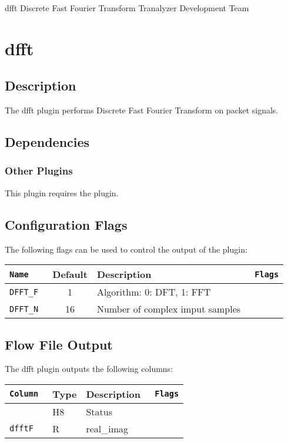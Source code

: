 \documentclass[documentation]{subfiles}
\begin{document}
\trantitle
    {dfft} %
    {Discrete Fast Fourier Transform} %
    {Tranalyzer Development Team} %

\section{dfft}\label{s:dfft}

\subsection{Description}
The dfft plugin performs Discrete Fast Fourier Transform on packet signals.

\subsection{Dependencies}

\subsubsection{Other Plugins}
This plugin requires the  plugin.

\subsection{Configuration Flags}
The following flags can be used to control the output of the plugin:
\begin{longtable}{>{\tt}lcl>{\tt\small}l}
    \toprule
    {\bf Name} & {\bf Default} & {\bf Description}               & {\bf Flags}\\
    \midrule\endhead%
    DFFT\_F     & 1            & Algorithm: 0: DFT, 1: FFT       & \\
    DFFT\_N     & 16           & Number of complex imput samples & \\
    \bottomrule
\end{longtable}

\subsection{Flow File Output}
The dfft plugin outputs the following columns:
\begin{longtable}{>{\tt}lll>{\tt\small}l}
    \toprule
    {\bf Column}                     & {\bf Type} & {\bf Description}             & {\bf Flags}\\
    \midrule\endhead%
    \nameref{dfftStat}               & H8         & Status                        & \\
    dfftF                            & R          & real\_imag                    & \\
    \bottomrule
\end{longtable}
\end{document}
